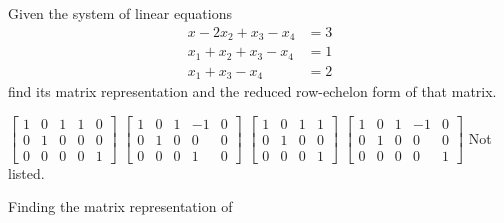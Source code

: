 \begin{questions}
  \question[10] Given the system of linear equations
  \[
    \label{eq:A}
    \tag{$*$}
    \begin{aligned}
      x-2x_2+x_3-x_4&=3\\
      x_1+x_2+x_3-x_4&=1\\
      x_1+x_3-x_4&=2
    \end{aligned}
  \]
    find its matrix representation and the reduced row-echelon form of that
    matrix.
  \begin{choices}
    \choice $\left[
      \begin{smallmatrix}
        1&0&1&1&0\\0&1&0&0&0\\0&0&0&0&1
      \end{smallmatrix}
    \right]$%
    \choice $\left[
      \begin{smallmatrix}
        1&0&1&-1&0\\0&1&0&0&0\\0&0&0&1&0
      \end{smallmatrix}
    \right]$%
    \choice $\left[
      \begin{smallmatrix}
        1&0&1&1\\0&1&0&0\\0&0&0&1
      \end{smallmatrix}
    \right]$%
    \choice $\left[
      \begin{smallmatrix}
        1&0&1&-1&0\\0&1&0&0&0\\0&0&0&0&1
      \end{smallmatrix}
    \right]$%
    \choice Not listed.
  \end{choices}
  \begin{solution}
    Finding the matrix representation of
  \end{solution}


\end{questions}
